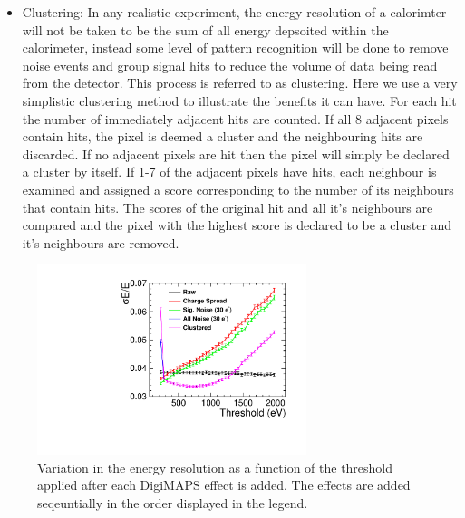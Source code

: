 \begin{itemize}
\item Clustering: In any realistic experiment, the energy resolution of a calorimter will not be taken to be the sum of all energy depsoited within the calorimeter, instead some level of pattern recognition will be done to remove noise events and group signal hits to reduce the volume of data being read from the detector. This process is referred to as clustering. Here we use a very simplistic clustering method to illustrate the benefits it can have. For each hit the number of immediately adjacent hits are counted. If all 8 adjacent pixels contain hits, the pixel is deemed a cluster and the neighbouring hits are discarded. If no adjacent pixels are hit then the pixel will simply be declared a cluster by itself. If 1-7 of the adjacent pixels have hits, each neighbour is examined and assigned a score corresponding to the number of its neighbours that contain hits. The scores of the original hit and all it's neighbours are compared and the pixel with the highest score is declared to be a cluster and it's neighbours are removed.  
\end{itemize}

\begin{figure}
  \centering
  \includegraphics[width=0.7\textwidth,keepaspectratio]{DECALStudies/fig/ThresholdScan.pdf}
  \caption{Variation in the energy resolution as a function of the threshold applied after each DigiMAPS effect is added. The effects are added seqeuntially in the order displayed in the legend.}
  \label{fig:digimapseffects}
\end{figure}

